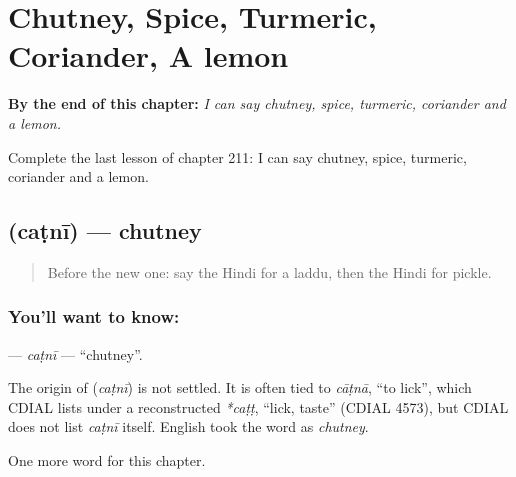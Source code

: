 
\chapter{Chutney, Spice, Turmeric, Coriander, A lemon}
\label{ch:hi-chutney-spice-turmeric-coriander-a-lemon}

\begin{chapteropening}
\textbf{By the end of this chapter:} \emph{I can say chutney, spice, turmeric, coriander and a lemon.}

Complete the last lesson of chapter 211: I can say chutney, spice, turmeric, coriander and a lemon.
\end{chapteropening}

\section[\texorpdfstring{\hi{चटनी} (caṭnī)}{चटनी (caṭnī)}]{ (caṭnī) — chutney}

\label{lesson:HI-C211-catni}



\begin{quote}
Before the new one: say the Hindi for a laddu, then the Hindi for pickle.
\end{quote}

\subsection*{You'll want to know: }
\textbf{} — \emph{caṭnī} — \textquotedblleft{}chutney\textquotedblright{}.

\begin{cousinweb}
The origin of \textbf{} (\emph{caṭnī}) is not settled. It is often tied to \emph{cāṭnā}, \textquotedblleft{}to lick\textquotedblright{}, which CDIAL lists under a reconstructed \emph{*caṭṭ}, \textquotedblleft{}lick, taste\textquotedblright{} (CDIAL 4573), but CDIAL does not list \emph{caṭnī} itself. English took the word as \emph{chutney}.
\end{cousinweb}

\begin{grammarlens}[title={What you've built}]
One more word for this chapter.
\end{grammarlens}

